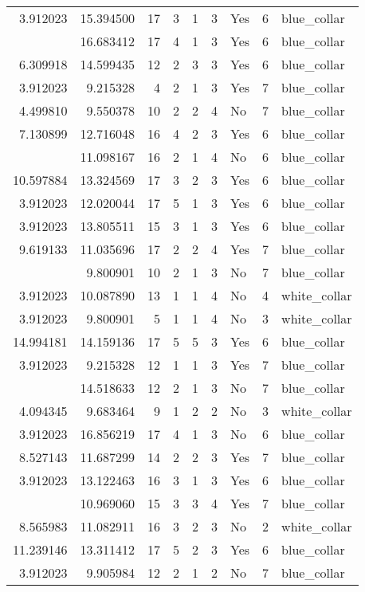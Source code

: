 \documentclass[
]{article}
\begin{document}
\begin{longtable}[t]{rrrrrllrl}
3.912023 & 15.394500 & 17 & 3 & 1 & 3 & Yes & 6 & blue\_collar\\
\addlinespace
3.912023 & 16.683412 & 17 & 4 & 1 & 3 & Yes & 6 & blue\_collar\\
6.309918 & 14.599435 & 12 & 2 & 3 & 3 & Yes & 6 & blue\_collar\\
3.912023 & 9.215328 & 4 & 2 & 1 & 3 & Yes & 7 & blue\_collar\\
4.499810 & 9.550378 & 10 & 2 & 2 & 4 & No & 7 & blue\_collar\\
7.130899 & 12.716048 & 16 & 4 & 2 & 3 & Yes & 6 & blue\_collar\\
\addlinespace
3.912023 & 11.098167 & 16 & 2 & 1 & 4 & No & 6 & blue\_collar\\
10.597884 & 13.324569 & 17 & 3 & 2 & 3 & Yes & 6 & blue\_collar\\
3.912023 & 12.020044 & 17 & 5 & 1 & 3 & Yes & 6 & blue\_collar\\
3.912023 & 13.805511 & 15 & 3 & 1 & 3 & Yes & 6 & blue\_collar\\
9.619133 & 11.035696 & 17 & 2 & 2 & 4 & Yes & 7 & blue\_collar\\
\addlinespace
3.912023 & 9.800901 & 10 & 2 & 1 & 3 & No & 7 & blue\_collar\\
3.912023 & 10.087890 & 13 & 1 & 1 & 4 & No & 4 & white\_collar\\
3.912023 & 9.800901 & 5 & 1 & 1 & 4 & No & 3 & white\_collar\\
14.994181 & 14.159136 & 17 & 5 & 5 & 3 & Yes & 6 & blue\_collar\\
3.912023 & 9.215328 & 12 & 1 & 1 & 3 & Yes & 7 & blue\_collar\\
\addlinespace
3.912023 & 14.518633 & 12 & 2 & 1 & 3 & No & 7 & blue\_collar\\
4.094345 & 9.683464 & 9 & 1 & 2 & 2 & No & 3 & white\_collar\\
3.912023 & 16.856219 & 17 & 4 & 1 & 3 & No & 6 & blue\_collar\\
8.527143 & 11.687299 & 14 & 2 & 2 & 3 & Yes & 7 & blue\_collar\\
3.912023 & 13.122463 & 16 & 3 & 1 & 3 & Yes & 6 & blue\_collar\\
\addlinespace
11.225910 & 10.969060 & 15 & 3 & 3 & 4 & Yes & 7 & blue\_collar\\
8.565983 & 11.082911 & 16 & 3 & 2 & 3 & No & 2 & white\_collar\\
11.239146 & 13.311412 & 17 & 5 & 2 & 3 & Yes & 6 & blue\_collar\\
3.912023 & 9.905984 & 12 & 2 & 1 & 2 & No & 7 & blue\_collar\\

\end{longtable}
\end{document}
